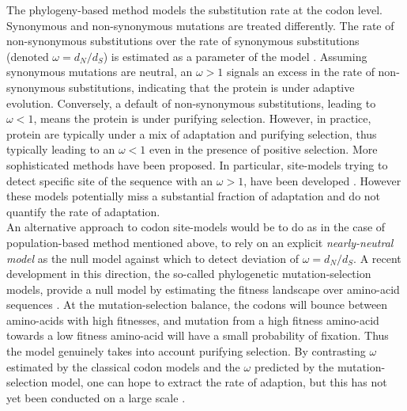 \documentclass[10pt]{article}
\begin{document}
\begin{multicols}{2}
	The phylogeny-based method models the substitution rate at the codon level. Synonymous and non-synonymous mutations are treated differently. The rate of non-synonymous substitutions over the rate of synonymous substitutions (denoted $\omega=d_N/d_S$) is estimated as a parameter of the model \cite{Muse1994,Goldman1994}. Assuming synonymous mutations are neutral, an $\omega>1$ signals an excess in the rate of non-synonymous substitutions, indicating that the protein is under adaptive evolution. Conversely, a default of non-synonymous substitutions, leading to $\omega<1$, means the protein is under purifying selection. However, in practice, protein are typically under a mix of adaptation and purifying selection, thus typically leading to an $\omega<1$ even in the presence of positive selection. More sophisticated methods have been proposed. In particular, site-models trying to detect specific site of the sequence with an $\omega>1$, have been developed \cite{Yang2001, kosiol_patterns_2008}.
	However these models potentially miss a substantial fraction of adaptation and do not quantify the rate of adaptation.  \\
	
	An alternative approach to codon site-models would be to do as in the case of population-based method mentioned above, to rely on an explicit \textit{nearly-neutral model} as the null model against which to detect deviation of $\omega=d_N/d_S$. A recent development in this direction, the so-called phylogenetic mutation-selection models, provide a null model by estimating the fitness landscape over amino-acid sequences \cite{Yang2008, Halpern1998, Rodrigue2010}. At the mutation-selection balance, the codons will bounce between amino-acids with high fitnesses, and mutation from a high fitness amino-acid towards a low fitness amino-acid will have a small probability of fixation. Thus the model genuinely takes into account purifying selection. By contrasting $\omega$ estimated by the classical codon models and the $\omega$ predicted by the mutation-selection model, one can hope to extract the rate of adaption, but this has not yet been conducted on a large scale \cite{Rodrigue2016}. \\
	

\end{multicols}
\end{document}
